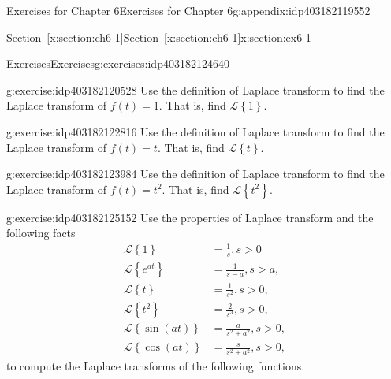 \documentclass[oneside,10pt,]{book}
\newcommand{\xreffont}{\relax}
\numberwithin{equation}{section}
\numberwithin{equation}{section}
\newcommand{\amp}{&}
\begin{document}
\begin{appendixptx}{Exercises for Chapter 6}{}{Exercises for Chapter 6}{}{}{g:appendix:idp403182119552}
%
%
\typeout{************************************************}
\typeout{Section F.1 Section~{\xreffont\ref*{x:section:ch6-1}}}
\typeout{************************************************}
%
\begin{sectionptx}{Section~{\xreffont\ref*{x:section:ch6-1}}}{}{Section~{\xreffont\ref*{x:section:ch6-1}}}{}{}{x:section:ex6-1}
%
%
\typeout{************************************************}
\typeout{************************************************}
%
\begin{exercises-subsection-numberless}{Exercises}{}{Exercises}{}{}{g:exercises:idp403182124640}
\begin{divisionexercise}{1}{}{}{g:exercise:idp403182120528}%
Use the definition of Laplace transform to find the Laplace transform of \(f(t)=1\). That is, find \(\mathcal{L}\left\{ 1\right\} .\)%
\end{divisionexercise}%
\begin{divisionexercise}{2}{}{}{g:exercise:idp403182122816}%
Use the definition of Laplace transform to find the Laplace transform of \(f(t)=t\). That is, find \(\mathcal{L}\left\{ t\right\} .\)%
\end{divisionexercise}%
\begin{divisionexercise}{3}{}{}{g:exercise:idp403182123984}%
Use the definition of Laplace transform to find the Laplace transform of \(f(t)=t^{2}\). That is, find \(\mathcal{L}\left\{ t^{2}\right\} .\)%
\end{divisionexercise}%
\begin{divisionexercise}{4}{}{}{g:exercise:idp403182125152}%
Use the properties of Laplace transform and the following facts%
\begin{align*}
\mathcal{L}\left\{ 1\right\}  \amp =\frac{1}{s},s>0\\
\mathcal{L}\left\{ e^{at}\right\}  \amp =\frac{1}{s-a},s>a,\\
\mathcal{L}\left\{ t\right\}  \amp =\frac{1}{s^{2}},s>0,\\
\mathcal{L}\left\{ t^{2}\right\}  \amp =\frac{2}{s^{3}},s>0,\\
\mathcal{L}\left\{ \sin(at)\right\}  \amp =\frac{a}{s^{2}+a^{2}},s>0,\\
\mathcal{L}\left\{ \cos(at)\right\}  \amp =\frac{s}{s^{2}+a^{2}},s>0,
\end{align*}
to compute the Laplace transforms of the following functions.%

\end{divisionexercise}
\end{exercises-subsection-numberless}
\end{sectionptx}
\end{appendixptx}
\end{document}
